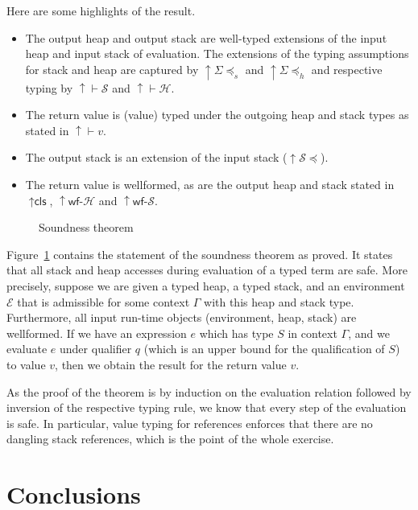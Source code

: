 \documentclass[sigplan,dvipsnames,screen]{acmart}
\begin{document}
Here are some highlights of the result.
\begin{itemize}
\item The output heap and output stack are well-typed extensions of
  the input heap and input stack of evaluation. The extensions of the
  typing assumptions for stack and heap are captured by
  ${\uparrow}\Sigma{\preceq_s}$ and  ${\uparrow}\Sigma{\preceq_h}$ and
  respective typing by ${\uparrow}{\vdash}\mathcal{S}$ and
  ${\uparrow}{\vdash}\mathcal{H}$.
\item The return value is (value) typed under the outgoing heap and
  stack types as stated in ${\uparrow}{\vdash} v$.
\item The output stack is an extension of the input stack (${\uparrow}\mathcal{S}{\preceq}$).
\item The return value is wellformed, as are the output heap and stack
  stated in ${\uparrow}\textsf{cls}$, ${\uparrow}\textsf{wf-}\mathcal{H}$ and ${\uparrow}\textsf{wf-}\mathcal{S}$.
\end{itemize}

\begin{figure}[tp]
  \EvalSoundness  
  \caption{Soundness theorem}
  \label{fig:soundness-theorem}
\end{figure}
Figure~\ref{fig:soundness-theorem} contains the statement of the
soundness theorem as proved. 
It states that all stack and heap accesses during evaluation of a
typed term are safe.
More precisely, suppose we are given a typed heap, a typed stack, and
an environment $\mathcal{E}$ that is admissible for some context
$\Gamma$ with this heap and stack type. Furthermore, all input
run-time objects (environment, heap, stack) are wellformed.
If we have an expression $e$ which has  type $S$ in context $\Gamma$,
and we evaluate $e$ under qualifier $q$ (which is an upper bound for
the qualification of $S$) to value $v$, then we obtain the result for the return
value $v$.

As the proof of the theorem is by induction on the evaluation relation
followed by inversion of the respective typing rule, we know that
every step of the evaluation is safe. In particular, value typing for
references enforces that there are no dangling stack references, which
is the point of the whole exercise.

\section{Conclusions}
\label{sec:conclusions}
\end{document}
